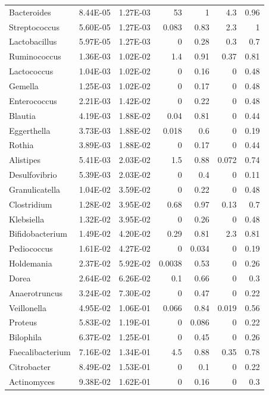 {\begin{longtable}{ | l | r | r | r | r | r | r  | }
		
		Bacteroides & 8.44E-05 & 1.27E-03 & 53 & 1 & 4.3 & 0.96 \\ 
		Streptococcus & 5.60E-05 & 1.27E-03 & 0.083 & 0.83 & 2.3 & 1 \\ 
		Lactobacillus & 5.97E-05 & 1.27E-03 & 0 & 0.28 & 0.3 & 0.7 \\ 
		Ruminococcus & 1.36E-03 & 1.02E-02 & 1.4 & 0.91 & 0.37 & 0.81 \\ 
		Lactococcus & 1.04E-03 & 1.02E-02 & 0 & 0.16 & 0 & 0.48 \\ 
		Gemella & 1.25E-03 & 1.02E-02 & 0 & 0.17 & 0 & 0.48 \\ 
		Enterococcus & 2.21E-03 & 1.42E-02 & 0 & 0.22 & 0 & 0.48 \\ 
		Blautia & 4.19E-03 & 1.88E-02 & 0.04 & 0.81 & 0 & 0.44 \\ 
		Eggerthella & 3.73E-03 & 1.88E-02 & 0.018 & 0.6 & 0 & 0.19 \\ 
		Rothia & 3.89E-03 & 1.88E-02 & 0 & 0.17 & 0 & 0.44 \\ 
		Alistipes & 5.41E-03 & 2.03E-02 & 1.5 & 0.88 & 0.072 & 0.74 \\ 
		Desulfovibrio & 5.39E-03 & 2.03E-02 & 0 & 0.4 & 0 & 0.11 \\ 
		Granulicatella & 1.04E-02 & 3.59E-02 & 0 & 0.22 & 0 & 0.48 \\ 
		Clostridium & 1.28E-02 & 3.95E-02 & 0.68 & 0.97 & 0.13 & 0.7 \\ 
		Klebsiella & 1.32E-02 & 3.95E-02 & 0 & 0.26 & 0 & 0.48 \\ 
		Bifidobacterium & 1.49E-02 & 4.20E-02 & 0.29 & 0.81 & 2.3 & 0.81 \\ 
		Pediococcus & 1.61E-02 & 4.27E-02 & 0 & 0.034 & 0 & 0.19 \\ 
		Holdemania & 2.37E-02 & 5.92E-02 & 0.0038 & 0.53 & 0 & 0.26 \\ 
		Dorea & 2.64E-02 & 6.26E-02 & 0.1 & 0.66 & 0 & 0.3 \\ 
		Anaerotruncus & 3.24E-02 & 7.30E-02 & 0 & 0.47 & 0 & 0.22 \\ 
		Veillonella & 4.95E-02 & 1.06E-01 & 0.066 & 0.84 & 0.019 & 0.56 \\ 
		Proteus & 5.83E-02 & 1.19E-01 & 0 & 0.086 & 0 & 0.22 \\ 
		Bilophila & 6.37E-02 & 1.25E-01 & 0 & 0.45 & 0 & 0.26 \\ 
		Faecalibacterium & 7.16E-02 & 1.34E-01 & 4.5 & 0.88 & 0.35 & 0.78 \\ 
		Citrobacter & 8.49E-02 & 1.53E-01 & 0 & 0.1 & 0 & 0.22 \\ 
		Actinomyces & 9.38E-02 & 1.62E-01 & 0 & 0.16 & 0 & 0.3 \\ 

\end{longtable}}
